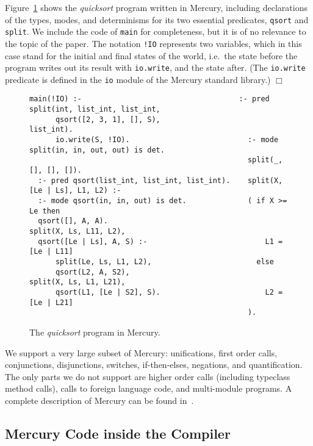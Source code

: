 \documentclass{tlp}
\newcommand{\code}[1]{{\tt#1}}
\begin{document}
\begin{example}
Figure~\ref{fig:running:normal} shows
the \emph{quicksort} program written in Mercury,
including declarations of the types, modes, and determinisms
for its two essential predicates, \code{qsort} and \code{split}.
We include the code of \code{main} for completeness,
but it is of no relevance to the topic of the paper.
The notation \code{!IO} represents two variables,
which in this case stand for the initial and final states of the world,
i.e.\ the state before the program writes out its result with \code{io.write},
and the state after.
(The \code{io.write} predicate is defined
in the \code{io} module of the Mercury standard library.)
\hfill $\Box$
\label{example:running:normal}
\end{example}
\begin{figure}
\scriptsize
\begin{Verbatim}[frame=single,framerule=0.2pt,framesep=3pt]
  main(!IO) :-                                    :- pred split(int, list_int, list_int,
      qsort([2, 3, 1], [], S),                        list_int).
      io.write(S, !IO).                           :- mode split(in, in, out, out) is det.
                                                  split(_, [], [], []).
  :- pred qsort(list_int, list_int, list_int).    split(X, [Le | Ls], L1, L2) :-
  :- mode qsort(in, in, out) is det.              ( if X >= Le then
  qsort([], A, A).                                    split(X, Ls, L11, L2),
  qsort([Le | Ls], A, S) :-                           L1 = [Le | L11]
      split(Le, Ls, L1, L2),                        else
      qsort(L2, A, S2),                               split(X, Ls, L1, L21),
      qsort(L1, [Le | S2], S).                        L2 = [Le | L21]
                                                  ).
\end{Verbatim}
\normalsize
\caption{The \emph{quicksort} program in Mercury.}
\label{fig:running:normal}
\end{figure}

We support a very large subset of Mercury:
unifications, first order calls,
conjunctions, disjunctions, switches,
if-then-elses, negations, and quantification.
The only parts we do not support are higher order calls
(including typeclass method calls),
calls to foreign language code,
and multi-module programs.
A complete description of Mercury can be found in~\cite{mercury_refman}.

\subsection{Mercury Code inside the Compiler}
\label{seCbgCinternal}
\end{document}
